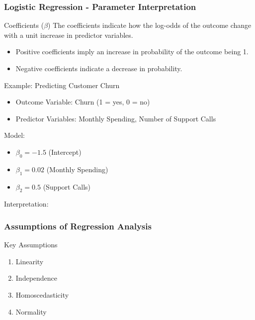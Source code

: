\documentclass{beamer}
\begin{document}
\begin{frame}[fragile]
    \frametitle{Logistic Regression - Parameter Interpretation}
    \begin{block}{Coefficients (\(\beta\))}
        The coefficients indicate how the log-odds of the outcome change with a unit increase in predictor variables.
    \end{block}
    \begin{itemize}
        \item Positive coefficients imply an increase in probability of the outcome being 1.
        \item Negative coefficients indicate a decrease in probability.
    \end{itemize}
    
    \begin{block}{Example: Predicting Customer Churn}
        \begin{itemize}
            \item Outcome Variable: Churn (1 = yes, 0 = no)
            \item Predictor Variables: Monthly Spending, Number of Support Calls
        \end{itemize}
        Model:
        \begin{itemize}
            \item $\beta_0 = -1.5$ (Intercept)
            \item $\beta_1 = 0.02$ (Monthly Spending)
            \item $\beta_2 = 0.5$ (Support Calls)
        \end{itemize}
        Interpretation:
    \end{block}
\end{frame}

\begin{frame}[fragile]
    \frametitle{Assumptions of Regression Analysis}
    
    \begin{block}{Key Assumptions}
        \begin{enumerate}
            \item Linearity
            \item Independence
            \item Homoscedasticity
            \item Normality
        \end{enumerate}
    \end{block}
\end{frame}
\end{document}
